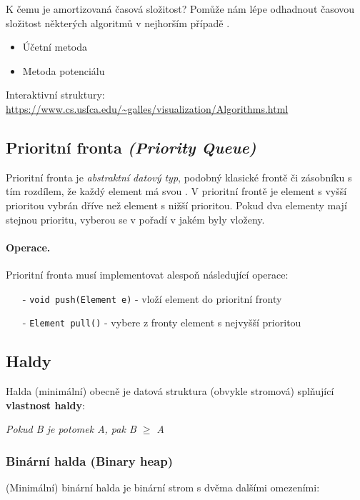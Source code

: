 K čemu je amortizovaná časová složitost? Pomůže nám lépe odhadnout časovou složitost některých algoritmů v nejhorším případě \cite{algoritmyeu:amortizovana}.

\begin{itemize}[itemsep=0pt, topsep=0pt]
    \item Účetní metoda
    \item Metoda potenciálu
\end{itemize}

\noindent Interaktivní struktury: \url{https://www.cs.usfca.edu/~galles/visualization/Algorithms.html}

\subsection{Prioritní fronta \textit{(Priority Queue)}}
Prioritní fronta je \textit{abstraktní datový typ}, podobný klasické frontě či zásobníku s tím rozdílem, že každý element má svou . V prioritní frontě je element s vyšší prioritou vybrán dříve než element s nižší prioritou. Pokud dva elementy mají stejnou prioritu, vyberou se v pořadí v jakém byly vloženy.

\paragraph{Operace.} Prioritní fronta musí implementovat alespoň následující operace:

\begin{itemize}[itemsep=0pt, topsep=2pt]
    \item[-] \texttt{void push(Element e)} - vloží element do prioritní fronty
    \item[-] \texttt{Element pull()} - vybere z fronty element s nejvyšší prioritou
\end{itemize}

\subsection{Haldy}
Halda (minimální) obecně je datová struktura (obvykle stromová) splňující \textbf{vlastnost haldy}:

\begin{center}
    \textit{Pokud B je potomek A, pak B $\geq$ A}
\end{center}

\subsubsection*{Binární halda (Binary heap)}
(Minimální) binární halda je binární strom s dvěma dalšími omezeními:

